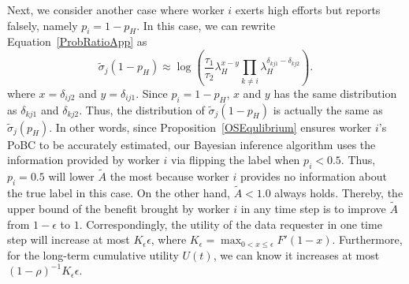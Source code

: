 \documentclass{article}
\begin{document}
Next, we consider another case where worker $i$ exerts high efforts but reports falsely, namely $p_i=1-p_H$. In this case, we can rewrite Equation~\ref{ProbRatioApp} as
\begin{equation}
\tilde{\sigma}_j(1-p_H)\approx \log\left(\frac{\tau_{1}}{\tau_{2}}\lambda_H^{x-y}{\prod}_{k\neq i}\lambda_H^{\delta_{kj1}-\delta_{kj2}}\right).
\end{equation}
where $x=\delta_{ij2}$ and $y=\delta_{ij1}$. Since $p_i=1-p_H$, $x$ and $y$ has the same distribution as $\delta_{kj1}$ and $\delta_{kj2}$. Thus, the distribution of $\tilde{\sigma}_j(1-p_H)$ is actually the same as $\tilde{\sigma}_j(p_H)$.
In other words, since Proposition~\ref{OSEqulibrium} ensures worker $i$'s PoBC to be accurately estimated, our Bayesian inference algorithm uses the information provided by worker $i$ via flipping the label when $p_i<0.5$.
Thus, $p_i=0.5$ will lower $\tilde{A}$ the most because worker $i$ provides no information about the true label in this case.
On the other hand, $\tilde{A}<1.0$ always holds.
Thereby, the upper bound of the benefit brought by worker $i$ in any time step is to improve $\tilde{A}$ from $1-\epsilon$ to $1$.
Correspondingly, the utility of the data requester in one time step will increase at most $K_{\epsilon} \epsilon$, where $K_{\epsilon}={\max}_{0<x\leq \epsilon}F'(1-x)$.
Furthermore, for the long-term cumulative utility $U(t)$, we can know it increases at most $(1-\rho)^{-1}K_{\epsilon} \epsilon$.

\end{document}
